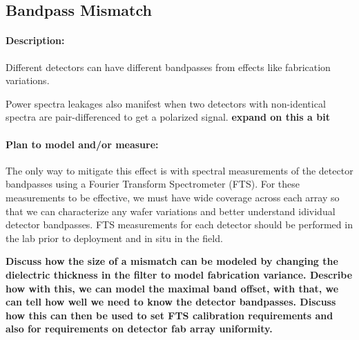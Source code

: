 \subsection{Bandpass Mismatch}

\paragraph{Description:}
Different detectors can have different bandpasses from effects like fabrication variations. 


Power spectra leakages also manifest when two detectors with non-identical spectra are pair-differenced to get a polarized signal. \textbf{expand on this a bit}

\paragraph{Plan to model and/or measure:}
The only way to mitigate this effect is with spectral measurements of the detector bandpasses using a Fourier Transform Spectrometer (FTS). For these measurements to be effective, we must have wide coverage across each array so that we can characterize any wafer variations and better understand idividual detector bandpasses. FTS measurements for each detector should be performed in the lab prior to deployment and in situ in the field.

\textbf{Discuss how the size of a mismatch can be modeled by changing the dielectric thickness in the filter to model fabrication variance. Describe how with this, we can model the maximal band offset, with that, we can tell how well we need to know the detector bandpasses. Discuss how this can then be used to set FTS calibration requirements and also for requirements on detector fab array uniformity.}

